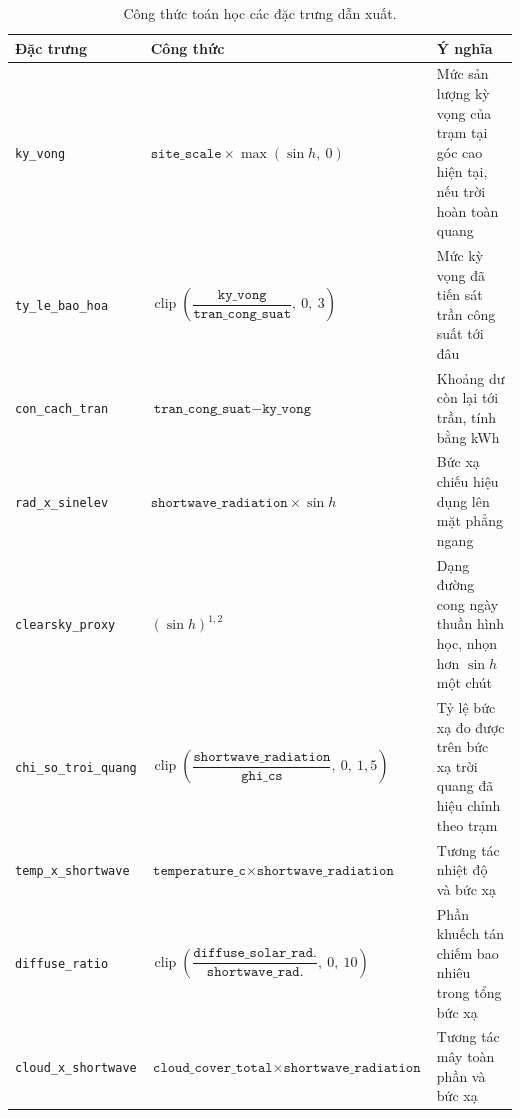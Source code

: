 \documentclass[12pt, a4paper]{report}
\begin{document}
\begin{table}[htbp]
\centering
\caption{Công thức toán học các đặc trưng dẫn xuất.}
\label{tab:dinh_nghia_dan_xuat}
\small
\begin{tabular}{@{}L{4.0cm} L{7.0cm} L{4.1cm}@{}}
\toprule
\textbf{Đặc trưng} & \textbf{Công thức} & \textbf{Ý nghĩa} \\
\midrule
\texttt{ky\_vong} &
$\texttt{site\_scale} \times \max(\sin h,\ 0)$ &
Mức sản lượng kỳ vọng của trạm tại góc cao hiện tại, nếu trời hoàn toàn quang \\
\addlinespace
\texttt{ty\_le\_bao\_hoa} &
$\operatorname{clip}\!\left(\dfrac{\texttt{ky\_vong}}{\texttt{tran\_cong\_suat}},\ 0,\ 3\right)$ &
Mức kỳ vọng đã tiến sát trần công suất tới đâu \\
\addlinespace
\texttt{con\_cach\_tran} &
$\texttt{tran\_cong\_suat} - \texttt{ky\_vong}$ &
Khoảng dư còn lại tới trần, tính bằng kWh \\
\addlinespace
\texttt{rad\_x\_sinelev} &
$\texttt{shortwave\_radiation} \times \sin h$ &
Bức xạ chiếu hiệu dụng lên mặt phẳng ngang \\
\addlinespace
\texttt{clearsky\_proxy} &
$(\sin h)^{1{,}2}$ &
Dạng đường cong ngày thuần hình học, nhọn hơn $\sin h$ một chút \\
\addlinespace
\texttt{chi\_so\_troi\_quang} &
$\operatorname{clip}\!\left(\dfrac{\texttt{shortwave\_radiation}}{\texttt{ghi\_cs}},\ 0,\ 1{,}5\right)$ &
Tỷ lệ bức xạ đo được trên bức xạ trời quang đã hiệu chỉnh theo trạm \\
\addlinespace
\texttt{temp\_x\_shortwave} &
$\texttt{temperature\_c} \times \texttt{shortwave\_radiation}$ &
Tương tác nhiệt độ và bức xạ \\
\addlinespace
\texttt{diffuse\_ratio} &
$\operatorname{clip}\!\left(\dfrac{\texttt{diffuse\_solar\_rad.}}{\texttt{shortwave\_rad.}},\ 0,\ 10\right)$ &
Phần khuếch tán chiếm bao nhiêu trong tổng bức xạ \\
\addlinespace
\texttt{cloud\_x\_shortwave} &
$\texttt{cloud\_cover\_total} \times \texttt{shortwave\_radiation}$ &
Tương tác mây toàn phần và bức xạ \\
\bottomrule
\end{tabular}
\end{table}
\end{document}

